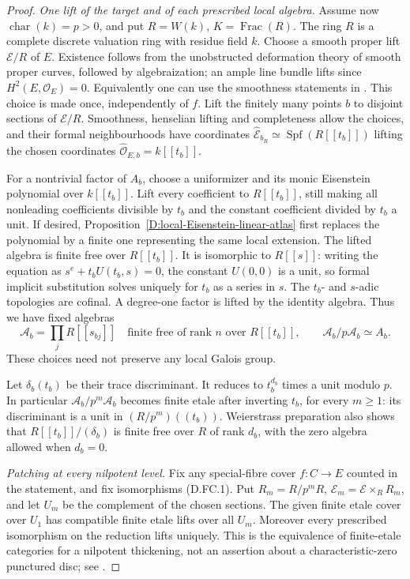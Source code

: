 \begin{proof}
\emph{One lift of the target and of each prescribed local algebra.}
Assume now $\operatorname{char}(k)=p>0$, and put $R=W(k)$,
$K=\operatorname{Frac}(R)$. The ring $R$ is a complete discrete
valuation ring with residue field $k$. Choose a smooth proper lift
$\mathcal E/R$ of $E$. Existence follows from the unobstructed
deformation theory of smooth proper curves, followed by
algebraization; an ample line bundle lifts since $H^2(E,\mathcal O_E)=0$.
Equivalently one can use the smoothness statements in
\citet[Tags 0DZQ and 0DZT, Lemmas 93.16.4 and 109.15.1--2]{StacksFormalCurveB}.
This choice is made once, independently of $f$.
Lift the finitely many points $b$ to disjoint sections of
$\mathcal E/R$. Smoothness, henselian lifting and completeness
allow the choices, and their formal neighbourhoods have coordinates
$\widehat{\mathcal E}_{b_R}\simeq\operatorname{Spf}(R[[t_b]])$
lifting the chosen coordinates $\widehat{\mathcal O}_{E,b}=k[[t_b]]$.

For a nontrivial factor of $A_b$, choose a uniformizer and its
monic Eisenstein polynomial over $k[[t_b]]$. Lift every coefficient
to $R[[t_b]]$, still making all nonleading coefficients divisible
by $t_b$ and the constant coefficient divided by $t_b$ a unit.
If desired, Proposition~\ref{D:local-Eisenstein-linear-atlas}
first replaces the polynomial by a finite one representing the
same local extension. The lifted algebra is finite free over
$R[[t_b]]$. It is isomorphic to $R[[s]]$: writing the equation as
$s^e+t_b U(t_b,s)=0$, the constant $U(0,0)$ is a unit, so formal
implicit substitution solves uniquely for $t_b$ as a series in
$s$. The $t_b$- and $s$-adic topologies are cofinal. A degree-one
factor is lifted by the identity algebra. Thus we have fixed
algebras
\[
        \mathcal A_b=\prod_{j}R[[s_{bj}]]
           \quad\text{finite free of rank }n\text{ over }R[[t_b]],
        \qquad \mathcal A_b/p\mathcal A_b\simeq A_b.   \tag{D.FC.5}
\]
These choices need not preserve any local Galois group.

Let $\delta_b(t_b)$ be their trace discriminant. It reduces to
$t_b^{d_b}$ times a unit modulo $p$. In particular
$\mathcal A_b/p^m\mathcal A_b$ becomes finite etale after inverting
$t_b$, for every $m\ge1$: its discriminant is a unit in
$(R/p^m)((t_b))$. Weierstrass preparation also shows that
$R[[t_b]]/(\delta_b)$ is finite free over $R$ of rank $d_b$,
with the zero algebra allowed when $d_b=0$.

\emph{Patching at every nilpotent level.}
Fix any special-fibre cover $f:C\to E$ counted in the statement,
and fix isomorphisms (D.FC.1). Put $R_m=R/p^mR$,
$\mathcal E_m=\mathcal E\times_R R_m$, and let $U_m$ be the
complement of the chosen sections. The given finite etale cover
over $U_1$ has compatible finite etale lifts over all $U_m$.
Moreover every prescribed isomorphism on the reduction lifts
uniquely. This is the equivalence of finite-etale categories for
a nilpotent thickening, not an assertion about a characteristic-zero
punctured disc; see \citet[Tag 0BQB, Lemma 58.8.3]{StacksFormalCurveB}.


\end{proof}
